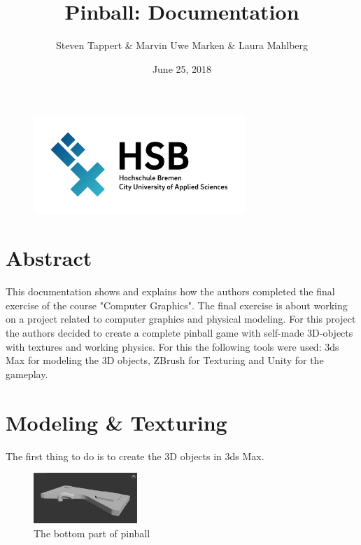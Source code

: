 \documentclass[11.5pt,oneside,a4paper]{scrartcl}
\title{Pinball: Documentation}
\author{Steven Tappert \& Marvin Uwe Marken \& Laura Mahlberg}
\date{June 25, 2018}
\newcounter{ct}
\begin{document}
\clearpage
{\let\newpage\relax\maketitle}
\thispagestyle{empty}
\vspace{20pt}

\begin{figure}
	\centering
	\includegraphics[width=8cm]{hsb.png} \\
\end{figure}

\newpage
\tableofcontents
\newpage

\section{Abstract}
This documentation shows and explains how the authors completed the final exercise of the course "Computer Graphics". The final exercise is about working on a project related to computer graphics and physical modeling. For this project the authors decided to create a complete pinball game with self-made 3D-objects with textures and working physics. For this the following tools were used: 3ds Max for modeling the 3D objects, ZBrush for Texturing and Unity for the gameplay. 

\section{Modeling \& Texturing}
The first thing to do is to create the 3D objects in 3ds Max.

\begin{figure}
	\centering
	\includegraphics[width=0.35\textwidth]{3dmodelbottom.jpg}
	\caption{The bottom part of pinball}
	\label{fig:pinballbottom}
	\vspace{0.6cm}
\end{figure}
\end{document}
